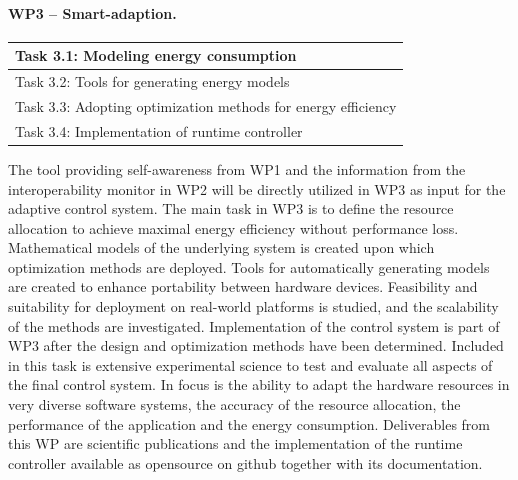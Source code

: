 \documentclass{article}
\begin{document}
\paragraph{WP3 -- Smart-adaption.}
\begin{table}
\vspace{-0.5cm}
\small
\begin{tabular}{ | l |}
\hline
Task 3.1: Modeling energy consumption\\ \hline
Task 3.2: Tools for generating energy models \\ \hline
Task 3.3: Adopting optimization methods for energy efficiency \\ \hline
Task 3.4: Implementation of runtime controller \\ \hline
\end{tabular}
\vspace{-0.3cm}
\end{table}
The tool providing self-awareness from WP1 and the information from the interoperability monitor in WP2 will be directly utilized in WP3 as input for the adaptive control system.
The main task in WP3 is to define the resource allocation to achieve maximal energy efficiency without performance loss.
Mathematical models of the underlying system is created upon which optimization methods are deployed.
Tools for automatically generating models are created to enhance portability between hardware devices.
Feasibility and suitability for deployment on real-world platforms is studied, and the scalability of the methods are investigated.
Implementation of the control system is part of WP3 after the design and optimization methods have been determined.
Included in this task is extensive experimental science to test and evaluate all aspects of the final control system.
In focus is the ability to adapt the hardware resources in very diverse software systems, the accuracy of the resource allocation, the performance of the application and the energy consumption.
Deliverables from this WP are scientific publications and the implementation of the runtime controller available as opensource on github together with its documentation.
\end{document}
